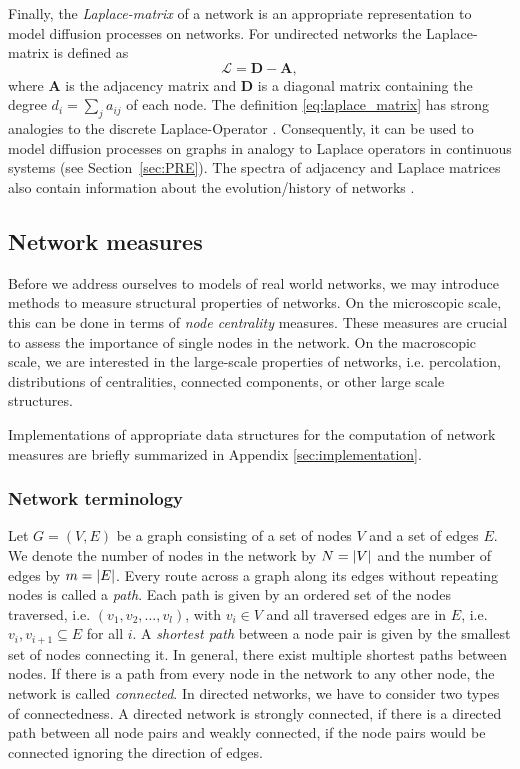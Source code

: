 Finally, the \emph{Laplace-matrix} of a network is an appropriate representation to model diffusion processes on networks.
For undirected networks the Laplace-matrix is defined as
\begin{equation}\label{eq:laplace_matrix}
\mathcal{L}=\mathbf{D}-\mathbf{A},
\end{equation}
where $\mathbf{A}$ is the adjacency matrix and $\mathbf{D}$ is a diagonal matrix containing the degree $d_i=\sum _j a_{ij}$ of each node.
The definition \eqref{eq:laplace_matrix} has strong analogies to the discrete Laplace-Operator \citep{Press:1992}.
Consequently, it can be used to model diffusion processes on graphs in analogy to Laplace operators in continuous systems (see Section~\ref{sec:PRE}).
The spectra of adjacency and Laplace matrices also contain information about the evolution/history of networks \citep{Banerjee2009}.

\subsection{Network measures}\label{sec:network_measures}
Before we address ourselves to models of real world networks, we may introduce methods to measure structural properties of networks.
On the microscopic scale, this can be done in terms of \emph{node centrality} measures.
These measures are crucial to assess the importance of single nodes in the network.
On the macroscopic scale, we are interested in the large-scale properties of networks, i.e. percolation, distributions of centralities, connected components, or other large scale structures.

Implementations of appropriate data structures for the computation of network measures are briefly summarized in Appendix \ref{sec:implementation}.

\subsubsection{Network terminology}\label{sec:network_terminology}
Let $G=(V,E)$ be a graph consisting of a set of nodes $V$ and a set of edges $E$.
We denote the number of nodes in the network by $N=\left| V \right|$ and the number of edges by $m=\left| E \right|$.
Every route across a graph along its edges without repeating nodes is called a \emph{path}.
Each path is given by an ordered set of the nodes traversed, i.e. $(v_1,v_2,\dots ,v_l)$, with $v_i \in V$ and all traversed edges are in $E$, i.e. $v_i,v_{i+1} \subseteq E$ for all $i$.
A \emph{shortest path} between a node pair is given by the smallest set of nodes connecting it.
In general, there exist multiple shortest paths between nodes.
If there is a path from every node in the network to any other node, the network is called \emph{connected}.
In directed networks, we have to consider two types of connectedness.
A directed network is strongly connected, if there is a directed path between all node pairs and weakly connected, if the node pairs would be connected ignoring the direction of edges.

